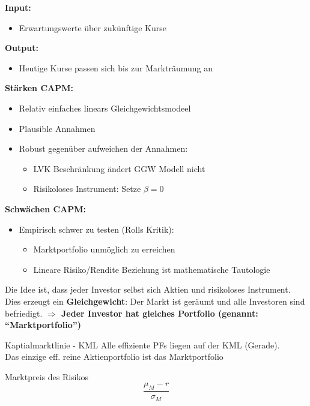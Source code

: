 \textbf{Input:}
\begin{itemize}
	\item Erwartungswerte über zukünftige Kurse
\end{itemize}

\textbf{Output:}
\begin{itemize}
	\item Heutige Kurse passen sich bis zur Markträumung an
\end{itemize}

\textbf{Stärken CAPM:}
\begin{itemize}
	\item Relativ einfaches linears Gleichgewichtsmodeel
	\item Plausible Annahmen
	\item Robust gegenüber aufweichen der Annahmen:
	\begin{itemize}
		\item LVK Beschränkung ändert GGW Modell nicht
		\item Risikoloses Instrument: Setze $\beta = 0$        
	\end{itemize}
\end{itemize}

\textbf{Schwächen CAPM:}
\begin{itemize}
	\item Empirisch schwer zu testen (Rolls Kritik):
	\begin{itemize}
		\item Marktportfolio unmöglich zu erreichen
		\item Lineare Risiko/Rendite Beziehung ist mathematische Tautologie
	\end{itemize}
\end{itemize}

Die Idee ist, dass jeder Investor selbst sich Aktien und risikoloses Instrument. Dies erzeugt ein \textbf{Gleichgewicht}: Der Markt ist geräumt und alle Investoren sind befriedigt. \textbf{$\Longrightarrow$ Jeder Investor hat gleiches Portfolio (genannt: ``Marktportfolio'')}

\begin{defi}{Kaptialmarktlinie - KML}
	Alle effiziente PFs liegen auf der KML (Gerade).\\
	Das einzige eff. reine Aktienportfolio ist das Marktportfolio
\end{defi}

\begin{defi}{Marktpreis des Risikos}
	$$\frac{\mu_M - r}{\sigma_M}$$
\end{defi}

